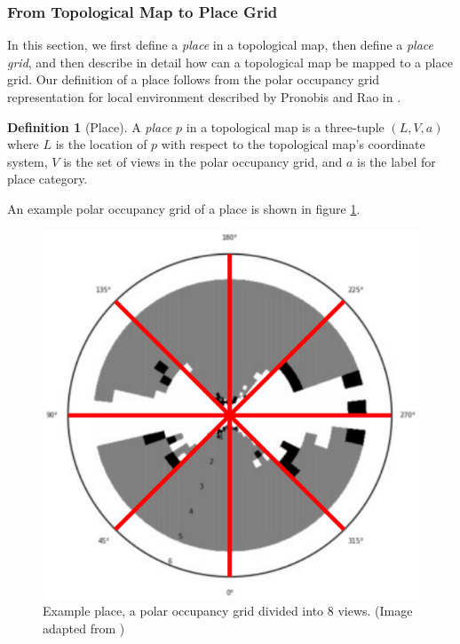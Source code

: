 \documentclass[10pt, titlepage]{article}
\theoremstyle{definition}
\newtheorem{definition}{Definition}[section]
\begin{document}
\subsubsection{From Topological Map to Place Grid}

In this section, we first define a \textit{place} in a topological map, then define a \textit{place grid}, and then describe in detail how can a topological map be mapped to a place grid. Our definition of a place follows from the polar occupancy grid representation for local environment described by Pronobis and Rao in \cite{pronobis2016learning}.

\begin{definition}[Place]
A \textit{place} $p$ in a topological map is a three-tuple $(L, V, a)$ where $L$ is the location of $p$ with respect to the topological map's coordinate system, $V$ is the set of views in the polar occupancy grid, and $a$ is the label for place category.
\end{definition}

\noindent An example polar occupancy grid of a place is shown in figure \ref{fig:place}.

\begin{figure}[!htb]
    \centering
    \captionsetup{width=.5\linewidth}
    \includegraphics[scale=0.15]{images/polar_grid.png}
    \caption{Example place, a polar occupancy grid divided into 8 views. (Image adapted from \cite{pronobis2016learning})}
    \label{fig:place}
\end{figure}
\end{document}
